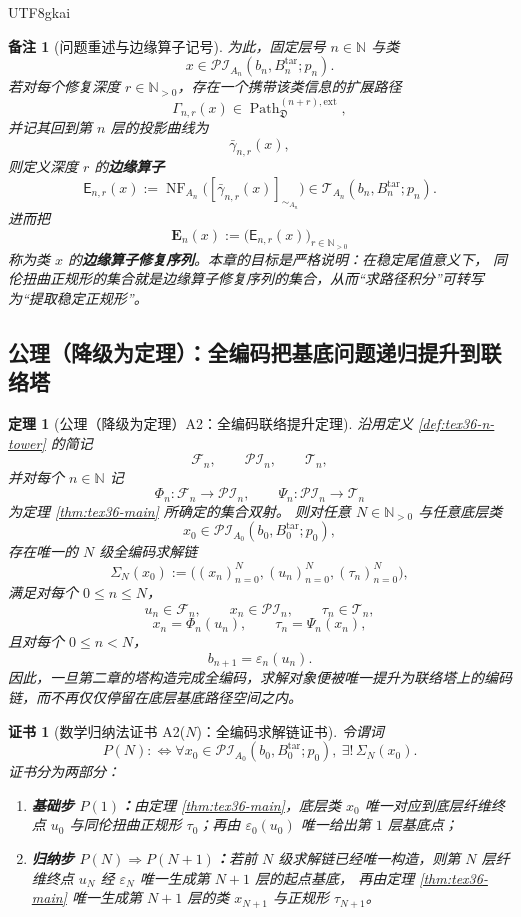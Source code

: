 \documentclass[12pt]{article}
\newtheorem{theorem}{定理}[section]
\newtheorem{remark}{备注}[section]
\newtheorem{Certificate}{证书}[section]
\newcommand{\NN}{\mathbb{N}}
\newcommand{\Path}{\operatorname{Path}}
\newcommand{\NF}{\operatorname{NF}}
\begin{document}
\begin{CJK*}{UTF8}{gkai}
\begin{remark}[问题重述与边缘算子记号]
为此，固定层号 $n\in\NN$ 与类
\[
  x\in \mathcal{PI}_{A_n}(b_n,B_n^{\mathrm{tar}};p_n).
\]
若对每个修复深度 $r\in\NN_{>0}$，存在一个携带该类信息的扩展路径
\[
  \Gamma_{n,r}(x)\in \Path_{\mathfrak D}^{(n+r),\mathrm{ext}},
\]
并记其回到第 $n$ 层的投影曲线为
\[
  \bar{\gamma}_{n,r}(x),
\]
则定义深度 $r$ 的\textbf{边缘算子}
\[
  \mathsf E_{n,r}(x)
  :=
  \NF_{A_n}\bigl([\bar{\gamma}_{n,r}(x)]_{\sim_{A_n}}\bigr)
  \in \mathcal{T}_{A_n}(b_n,B_n^{\mathrm{tar}};p_n).
\]
进而把
\[
  \mathbf E_n(x)
  :=
  \bigl(\mathsf E_{n,r}(x)\bigr)_{r\in\NN_{>0}}
\]
称为类 $x$ 的\textbf{边缘算子修复序列}。本章的目标是严格说明：在稳定尾值意义下，
同伦扭曲正规形的集合就是边缘算子修复序列的集合，从而“求路径积分”可转写为“提取稳定正规形”。
\end{remark}

\subsection{公理（降级为定理）：全编码把基底问题递归提升到联络塔}
\label{subsec:tex36-global-encoding-lift}

\begin{theorem}[公理（降级为定理）A2：全编码联络提升定理]
\label{thm:tex36-a2}
沿用定义 \ref{def:tex36-n-tower} 的简记
\[
  \mathcal{F}_n,\qquad
  \mathcal{PI}_n,\qquad
  \mathcal{T}_n,
\]
并对每个 $n\in\NN$ 记
\[
  \Phi_n:\mathcal{F}_n\to \mathcal{PI}_n,
  \qquad
  \Psi_n:\mathcal{PI}_n\to \mathcal{T}_n
\]
为定理 \ref{thm:tex36-main} 所确定的集合双射。
则对任意 $N\in\NN_{>0}$ 与任意底层类
\[
  x_0\in \mathcal{PI}_{A_0}(b_0,B_0^{\mathrm{tar}};p_0),
\]
存在唯一的 $N$ 级全编码求解链
\[
  \Sigma_N(x_0)
  :=
  \bigl(
    (x_n)_{n=0}^{N},
    (u_n)_{n=0}^{N},
    (\tau_n)_{n=0}^{N}
  \bigr),
\]
满足对每个 $0\le n\le N$，
\[
  u_n\in \mathcal{F}_n,\qquad
  x_n\in \mathcal{PI}_n,\qquad
  \tau_n\in \mathcal{T}_n,
\]
\[
  x_n=\Phi_n(u_n),
  \qquad
  \tau_n=\Psi_n(x_n),
\]
且对每个 $0\le n<N$，
\[
  b_{n+1}=\varepsilon_n(u_n).
\]
因此，一旦第二章的塔构造完成全编码，求解对象便被唯一提升为联络塔上的编码链，而不再仅仅停留在底层基底路径空间之内。
\end{theorem}

\begin{Certificate}[数学归纳法证书 A2($N$)：全编码求解链证书]
\label{cert:tex36-a2}
令谓词
\[
  P(N)
  :
  \Longleftrightarrow
  \forall x_0\in \mathcal{PI}_{A_0}(b_0,B_0^{\mathrm{tar}};p_0),\
  \exists!\,\Sigma_N(x_0).
\]
证书分为两部分：
\begin{enumerate}
  \item \textbf{基础步 $P(1)$：}由定理 \ref{thm:tex36-main}，底层类 $x_0$ 唯一对应到底层纤维终点 $u_0$ 与同伦扭曲正规形 $\tau_0$；再由 $\varepsilon_0(u_0)
    $ 唯一给出第 $1$ 层基底点；
  \item \textbf{归纳步 $P(N)\Rightarrow P(N+1)$：}若前 $N$ 级求解链已经唯一构造，则第 $N$ 层纤维终点 $u_N$ 经 $\varepsilon_N$ 唯一生成第 $N+1$ 层的起点基底，
    再由定理 \ref{thm:tex36-main} 唯一生成第 $N+1$ 层的类 $x_{N+1}$ 与正规形 $\tau_{N+1}$。
\end{enumerate}
\end{Certificate}


\end{CJK*}
\end{document}
